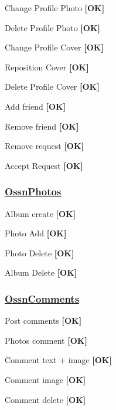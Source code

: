 \begin{DoxyItemize}
\item Change Profile Photo {\bfseries \mbox{[}OK\mbox{]}}
\item Delete Profile Photo {\bfseries \mbox{[}OK\mbox{]}}
\item Change Profile Cover {\bfseries \mbox{[}OK\mbox{]}}
\item Reposition Cover {\bfseries \mbox{[}OK\mbox{]}}
\item Delete Profile Cover {\bfseries \mbox{[}OK\mbox{]}}
\item Add friend {\bfseries \mbox{[}OK\mbox{]}}
\item Remove friend {\bfseries \mbox{[}OK\mbox{]}}
\item Remove request {\bfseries \mbox{[}OK\mbox{]}}
\item Accept Request {\bfseries \mbox{[}OK\mbox{]}}
\end{DoxyItemize}

\subsubsection*{\hyperlink{class_ossn_photos}{Ossn\+Photos}}


\begin{DoxyItemize}
\item Album create {\bfseries \mbox{[}OK\mbox{]}}
\item Photo Add {\bfseries \mbox{[}OK\mbox{]}}
\item Photo Delete {\bfseries \mbox{[}OK\mbox{]}}
\item Album Delete {\bfseries \mbox{[}OK\mbox{]}}
\end{DoxyItemize}

\subsubsection*{\hyperlink{class_ossn_comments}{Ossn\+Comments}}


\begin{DoxyItemize}
\item Post comments {\bfseries \mbox{[}OK\mbox{]}}
\item Photos comment {\bfseries \mbox{[}OK\mbox{]}}
\item Comment text + image {\bfseries \mbox{[}OK\mbox{]}}
\item Comment image {\bfseries \mbox{[}OK\mbox{]}}
\item Comment delete {\bfseries \mbox{[}OK\mbox{]}}
\end{DoxyItemize}

